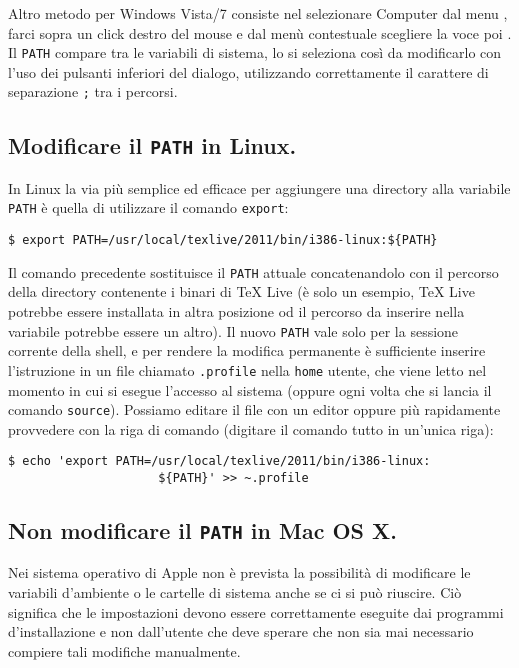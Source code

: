 Altro metodo per Windows Vista/7 consiste nel selezionare Computer dal menu
, farci sopra un click destro del mouse e dal menù contestuale
scegliere la voce  poi . Il \texttt{PATH} compare tra le
variabili di sistema, lo si seleziona così da modificarlo con l'uso dei pulsanti
inferiori del dialogo, utilizzando correttamente il carattere di separazione
\texttt{;} tra i percorsi.

\subsection{Modificare il \texttt{PATH} in Linux.}

In Linux la via più semplice ed efficace per aggiungere una directory alla
variabile \texttt{PATH} è quella di utilizzare il comando \texttt{export}:
\begin{verbatim}
$ export PATH=/usr/local/texlive/2011/bin/i386-linux:${PATH}
\end{verbatim}

Il comando precedente sostituisce il \texttt{PATH} attuale concatenandolo con il
percorso della directory contenente i binari di \TeX{} Live (è solo un esempio,
\TeX{} Live potrebbe essere installata in altra posizione od il percorso da
inserire nella variabile potrebbe essere un altro). Il nuovo \texttt{PATH} vale
solo per la sessione corrente della shell, e per rendere la modifica permanente
è sufficiente inserire l'istruzione in un file chiamato \texttt{.profile} nella
\texttt{home} utente, che viene letto nel momento in cui si esegue l'accesso al
sistema (oppure ogni volta che si lancia il comando \texttt{source}). Possiamo
editare il file con un editor oppure più rapidamente provvedere con la riga di
comando (digitare il comando tutto in un'unica riga):
\begin{verbatim}
$ echo 'export PATH=/usr/local/texlive/2011/bin/i386-linux:
                     ${PATH}' >> ~.profile
\end{verbatim}


\subsection{Non modificare il \texttt{PATH} in Mac OS X.}

Nei sistema operativo di Apple non è prevista la possibilità di modificare le
variabili d'ambiente o le cartelle di sistema anche se ci si può riuscire. Ciò
significa che le impostazioni devono essere correttamente eseguite dai programmi
d'installazione e non dall'utente che deve sperare che non sia mai necessario
compiere tali modifiche manualmente.




